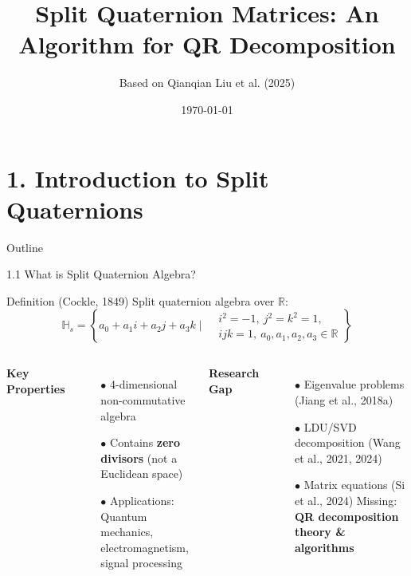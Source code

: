 \documentclass{beamer}
\title{Split Quaternion Matrices: An Algorithm for QR Decomposition}
\author[Liu QQ]{Based on Qianqian Liu et al. (2025)}
\institute[MUST]{Macau University of Science and Technology \\ University of Manitoba}
\date{\today}
\begin{document}
\begin{frame}
  \titlepage
\end{frame}


\section{1. Introduction to Split Quaternions}
\begin{frame}{Outline}
  \tableofcontents[sectionstyle=show/shaded, subsectionstyle=show/show/shaded]
\end{frame}

\begin{frame}{1.1 What is Split Quaternion Algebra?}
  \begin{exampleblock}{Definition (Cockle, 1849)}
    Split quaternion algebra over $\mathbb{R}$:
    \[
    \mathbb{H}_{s}=\left\{a_{0}+a_{1}i+a_{2}j+a_{3}k \mid 
    \begin{aligned}
    &i^2=-1,\ j^2=k^2=1, \\
    &ijk=1,\ a_0,a_1,a_2,a_3\in\mathbb{R}
    \end{aligned}\right\}
    \]
  \end{exampleblock}
  \vspace{0em}
  
  \begin{columns}[T]
    \textbf{Key Properties}
    \begin{itemize}
        \item[$\bullet$] 4-dimensional non-commutative algebra
        \item[$\bullet$] Contains \textbf{zero divisors} (not a Euclidean space)
        \item[$\bullet$] Applications: Quantum mechanics, electromagnetism, signal processing
    \end{itemize}
      
    
    \textbf{Research Gap}
    \begin{itemize}
        \item[$\bullet$] Eigenvalue problems (Jiang et al., 2018a)
        \item[$\bullet$] LDU/SVD decomposition (Wang et al., 2021, 2024)
        \item[$\bullet$] Matrix equations (Si et al., 2024)
        Missing: \textbf{QR decomposition theory \& algorithms}
    \end{itemize}
  \end{columns}
\end{frame}
\end{document}
